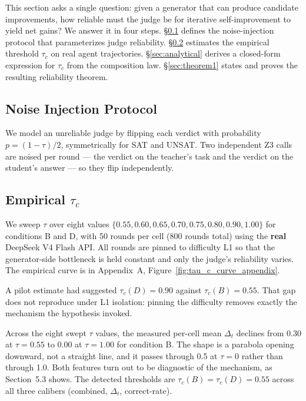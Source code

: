 \documentclass{article}
\begin{document}
This section asks a single question: given a generator that can produce candidate improvements, how reliable must the judge be for iterative self-improvement to yield net gains? We answer it in four steps. \S\ref{sec:noise} defines the noise-injection protocol that parameterizes judge reliability. \S\ref{sec:empirical_tau} estimates the empirical threshold $\tau_c$ on real agent trajectories. \S\ref{sec:analytical} derives a closed-form expression for $\tau_c$ from the composition law. \S\ref{sec:theorem1} states and proves the resulting reliability theorem.

\subsection{Noise Injection Protocol}
\label{sec:noise}

We model an unreliable judge by flipping each verdict with probability $p = (1-\tau)/2$,
symmetrically for SAT and UNSAT. Two independent Z3 calls are noised per round --- the verdict on
the teacher's task and the verdict on the student's answer --- so they flip independently.

\subsection{Empirical $\tau_c$}
\label{sec:empirical_tau}

We sweep $\tau$ over eight values $\{0.55, 0.60, 0.65, 0.70, 0.75, 0.80, 0.90, 1.00\}$ for
conditions B and D, with 50 rounds per cell (800 rounds total) using the \textbf{real} DeepSeek V4
Flash API. All rounds are pinned to difficulty L1 so that the generator-side bottleneck is held
constant and only the judge's reliability varies. The empirical curve is in Appendix~A,
Figure~\ref{fig:tau_c_curve_appendix}.

A pilot estimate had suggested $\tau_c(D) = 0.90$ against $\tau_c(B) = 0.55$. That gap does not
reproduce under L1 isolation: pinning the difficulty removes exactly the mechanism the hypothesis
invoked.

Across the eight swept $\tau$ values, the measured per-cell mean $\Delta_t$ declines from 0.30 at
$\tau = 0.55$ to 0.00 at $\tau = 1.00$ for condition B. The shape is a parabola opening
downward, not a straight line, and it passes through 0.5 at $\tau = 0$ rather than through 1.0. Both
features turn out to be diagnostic of the mechanism, as Section~5.3 shows. The detected thresholds are
$\tau_c(B) = \tau_c(D) = 0.55$ across all three calibers (combined, $\Delta_t$, correct-rate).
\end{document}
